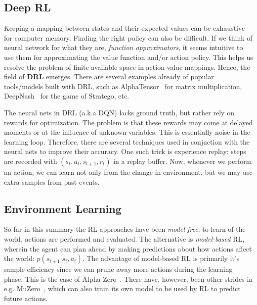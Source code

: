 \documentclass[10pt,twocolumn,letterpaper]{article}
\begin{document}

\subsection{Deep RL}
Keeping a mapping between states and their expected values can be exhaustive for computer memory. Finding the right policy can also be difficult. If we think of neural network for what they are, \textit{function approximators}, it seems intuitive to use them for approximating the value function and/or action policy. This helps us resolve the problem of finite available space in action-value mappings. Hence, the field of \textbf{\gls{DRL}} emerges. There are several examples already of popular tools/models built with \gls{DRL}, such as AlphaTensor~\cite{alphaTensor} for matrix multiplication, DeepNash~\cite{stratego} for the game of Stratego, etc. 

The neural nets in \gls{DRL} (a.k.a \gls{DQN}) lacks ground truth, but rather rely on rewards for optimization. The problem is that these rewards may come at delayed moments or at the influence of unknown variables. This is essentially noise in the learning loop. Therefore, there are several techniques used in conjuction with the neural nets to improve their accuracy. One such trick is experience replay: steps are recorded with $(s_{t}, a_{t}, s_{t+1}, r_{t})$ in a replay buffer. Now, whenever we perform an action, we can learn not only from the change in environment, but we may use extra samples from past events.


\subsection{Environment Learning}
So far in this summary the \gls{RL} approaches have been \textit{model-free}: to learn of the world, actions are performed and evaluated. The alternative is \textit{model-based} \gls{RL}, wherein the agent can plan ahead by making predictions about how actions affect the world: $p(s_{t+1} \vert{} s_{t}, a_{t})$. The advantage of model-based \gls{RL} is primarily it's sample efficiency since we can prune away more actions during the learning phase. This is the case of Alpha Zero~\cite{alphaZero}. There have, however, been other strides in e.g. MuZero~\cite{muZero}, which can also train its own model to be used by \gls{RL} to predict future actions.
\end{document}
